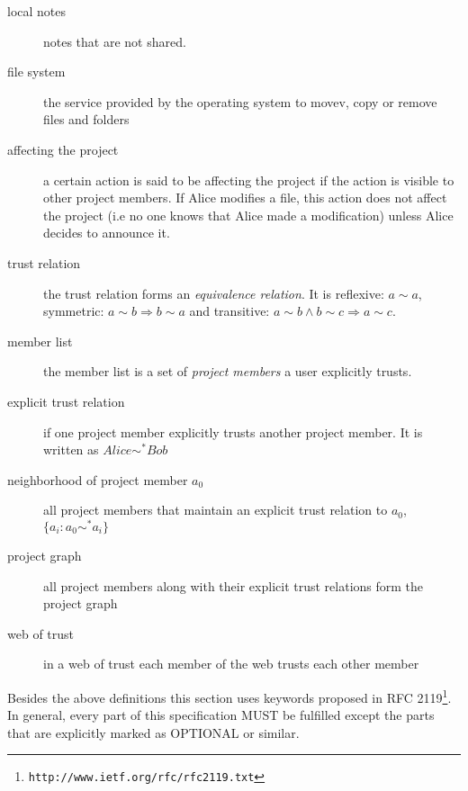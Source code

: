 \begin{description}
\item[local notes] notes that are not shared.
\item[file system] the service provided by the operating system to movev, copy or remove files and folders
\item[affecting the project] a certain action is said to be affecting the project if the action is visible to other project members. If Alice modifies a file, this action does not affect the project (i.e no one knows that Alice made a modification) unless Alice decides to announce it.
\item[trust relation] the trust relation forms an \emph{equivalence relation}. It is reflexive: $a \sim a$, symmetric: $a \sim b \Rightarrow b \sim a$ and transitive: $a \sim b \wedge b \sim c \Rightarrow a \sim c$. 
\item[member list] the member list is a set of \emph{project members} a user explicitly trusts.
\item[explicit trust relation] if one project member explicitly trusts another project member. It is written as $Alice \sim ^* Bob$
\item[neighborhood of project member $a_0$] all project members that maintain an explicit trust relation to $a_0$, $\{a_i: a_0 \sim ^* a_i\}$
\item[project graph] all project members along with their explicit trust relations form the project graph
\item[web of trust] in a web of trust each member of the web trusts each other member 

\end{description}
Besides the above definitions this section uses keywords proposed in RFC 2119\footnote{\texttt{http://www.ietf.org/rfc/rfc2119.txt}}. In general, every part of this specification MUST be fulfilled except the parts that are explicitly marked as OPTIONAL or similar.

